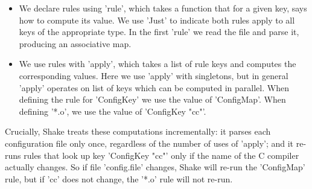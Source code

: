 \begin{itemize}
\item We declare rules using \lst'rule', which takes a function that for a given key,
says how to compute its value. We use \lst'Just' to indicate both rules apply to all
keys of the appropriate type. In the first \lst'rule' we read the file and parse it,
producing an associative map.
\item We use rules with \lst'apply', which takes a list of rule keys and computes the
corresponding values. Here we use \lst'apply' with singletons, but in general \lst'apply'
operates on list of keys which can be computed in parallel. When defining the rule
for \lst'ConfigKey' we use the value of \lst'ConfigMap'. When defining \lst'*.o',
we use the value of \lst'ConfigKey "cc"'.
\end{itemize}

Crucially, Shake treats these computations incrementally: it parses each
configuration file only once, regardless of the number of uses of \lst'apply'; and
it re-runs rules that look up key \lst'ConfigKey "cc"' only if the
name of the C compiler actually changes.  So if file \lst'config.file' changes,
Shake will re-run the \lst'ConfigMap' rule, but if \lst'cc' does
not change, the \lst'*.o' rule will not re-run.

%

